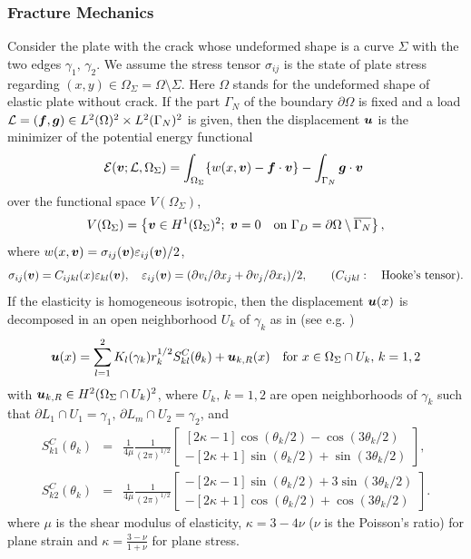 \documentclass[a4paper,twoside,12pt]{book}
\def\vec#1{\mbox{\boldmath $#1$}}
\def\p{\partial}
\begin{document}
\subsubsection{Fracture Mechanics}
Consider the plate with the crack whose undeformed shape is
a curve $\Sigma$ with the two edges $\gamma_1,\, \gamma_2$.
We assume the stress tensor $\sigma_{ij}$ is the state of
plate stress regarding $(x,y)\in \Omega_{\Sigma}=\Omega\setminus \Sigma$.
Here $\Omega$ stands for the undeformed shape of elastic plate
without crack.
If the part $\Gamma_N$ of the boundary $\p\Omega$ is fixed
and a load ${\cal L}=(\vec f,\vec g)\in
L^2(\Omega)^2\times L^2(\Gamma_N)^2$  is given,
then the displacement $\vec u$ is the minimizer of the potential energy
functional
\[
{\cal E}(\vec v;{\cal L},\Omega_{\Sigma})
=\int_{\Omega_{\Sigma}}
\{w(x,\vec v)-\vec f\cdot \vec v\}
-\int_{\Gamma_N}\vec g\cdot \vec v\
\]
over the functional space $V(\Omega_{\Sigma})$,
\[
V(\Omega_{\Sigma})
=\left\{ \vec v\in H^1(\Omega_{\Sigma})^2;\;
\vec v=0\quad \hbox{\rm on }
\Gamma_D=\p\Omega\setminus\overline{\Gamma_N}\right\},
\]
where $w(x,\vec v)=\sigma_{ij}(\vec v)\varepsilon_{ij}(\vec v)/2$,
\[
\sigma_{ij}(\vec v)=C_{ijkl}(x)\varepsilon_{kl}(\vec v),\quad
\varepsilon_{ij}(\vec v)=(\p v_i/\p x_j+
\p v_j/\p x_i)/2,
\qquad (C_{ijkl}:\quad \hbox{\rm Hooke's tensor}).
\]
If the elasticity is homogeneous isotropic, then the
displacement $\vec u(x)$ is decomposed in an open neighborhood $U_k$
of $\gamma_k$ as in (see e.g. \cite{Ohtsuka})
\begin{equation}
\label{eqn:SIF}
\vec u(x) =
\sum_{l=1}^2 K_l(\gamma_k) r_k^{1/2} S^C_{kl}(\theta_k)
+ \vec u_{k,R}(x)
\quad \mbox{for }x\in \Omega_{\Sigma}\cap U_k,\, k=1,2
\end{equation}
with $\vec u_{k,R} \in H^2(\Omega_\Sigma\cap U_k)^2$, where
$U_k,\, k=1,2$ are open neighborhoods of $\gamma_k$ such that
$\p L_1\cap U_1=\gamma_1,\, \p L_m\cap U_2=\gamma_2$,
and
\begin{eqnarray}
\label{eqn:SIF2}
 S^C_{k1}(\theta_k) & = & \frac 1 {4\mu} \frac 1 {(2\pi)^{1/2}}
    \left[ \begin{array}{c}
    [2\kappa-1]\cos(\theta_k/2)-\cos(3\theta_k/2)\\
    -[2\kappa+1]\sin(\theta_k/2)+\sin(3\theta_k/2)
    \end{array}\right],\\
 S^C_{k2}(\theta_k) & = & \frac 1 {4\mu} \frac 1 {(2\pi)^{1/2}}
    \left[ \begin{array}{c}
    -[2\kappa-1]\sin(\theta_k/2)+3\sin(3\theta_k/2)\\
    -[2\kappa+1]\cos(\theta_k/2)+\cos(3\theta_k/2)
    \end{array}\right]. \nonumber
\end{eqnarray}
where $\mu$ is the shear modulus of elasticity,
$\kappa=3-4\nu$ ($\nu$ is the Poisson's ratio) for
plane strain and $\kappa=\frac {3-\nu} {1+\nu}$ for plane stress.
\end{document}
